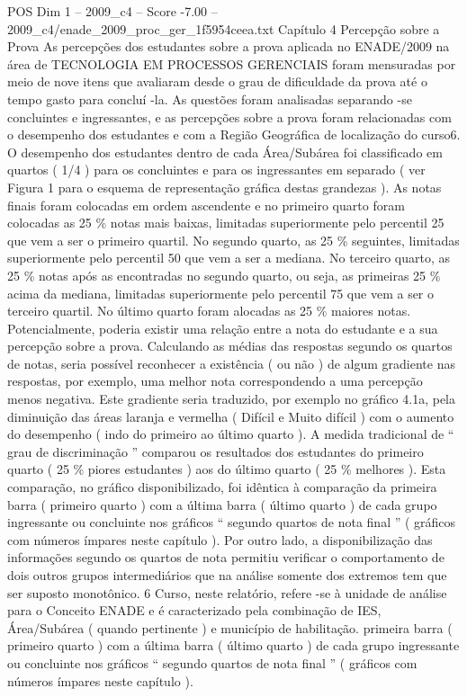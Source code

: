 \begin{textsample}{POS Dim 1 – 2009\_c4 – Score -7.00 – 2009\_c4/enade\_2009\_proc\_ger\_1f5954ceea.txt}  \label{ex:f1_pos_416}
Capítulo 4 Percepção sobre a Prova As percepções dos estudantes sobre a prova aplicada no ENADE/2009 na área de TECNOLOGIA EM PROCESSOS GERENCIAIS foram mensuradas por meio de nove itens que avaliaram desde o grau de dificuldade da prova até o tempo gasto para concluí -la.
As questões foram analisadas separando -se concluintes e ingressantes, e as percepções sobre a prova foram relacionadas com o desempenho dos estudantes e com a Região Geográfica de localização do curso6.
O desempenho dos estudantes dentro de cada Área/Subárea foi classificado em quartos ( 1/4 ) para os concluintes e para os ingressantes em separado ( ver Figura 1 para o esquema de representação gráfica destas grandezas ).
As notas finais foram colocadas em ordem ascendente e no primeiro quarto foram colocadas as 25 \% notas mais baixas, limitadas superiormente pelo percentil 25 que vem a ser o primeiro quartil.
No segundo quarto, as 25 \% seguintes, limitadas superiormente pelo percentil 50 que vem a ser a mediana.
No terceiro quarto, as 25 \% notas após as encontradas no segundo quarto, ou seja, as primeiras 25 \% acima da mediana, limitadas superiormente pelo percentil 75 que vem a ser o terceiro quartil.
No último quarto foram alocadas as 25 \% maiores notas.
Potencialmente, poderia existir uma relação entre a nota do estudante e a sua percepção sobre a prova.
Calculando as médias das respostas segundo os quartos de notas, seria possível reconhecer a existência ( ou não ) de algum gradiente nas respostas, por exemplo, uma melhor nota correspondendo a uma percepção menos negativa.
Este gradiente seria traduzido, por exemplo no gráfico 4.1a, pela diminuição das áreas laranja e vermelha ( Difícil e Muito difícil ) com o aumento do desempenho ( indo do primeiro ao último quarto ).
A medida tradicional de “ grau de discriminação ” comparou os resultados dos estudantes do primeiro quarto ( 25 \% piores estudantes ) aos do último quarto ( 25 \% melhores ).
Esta comparação, no gráfico disponibilizado, foi idêntica à comparação da primeira barra ( primeiro quarto ) com a última barra ( último quarto ) de cada grupo ingressante ou concluinte nos gráficos “ segundo quartos de nota final ” ( gráficos com números ímpares neste capítulo ).
Por outro lado, a disponibilização das informações segundo os quartos de nota permitiu verificar o comportamento de dois outros grupos intermediários que na análise somente dos extremos tem que ser suposto monotônico. 6 Curso, neste relatório, refere -se à unidade de análise para o Conceito ENADE e é caracterizado pela combinação de IES, Área/Subárea ( quando pertinente ) e município de habilitação. primeira barra ( primeiro quarto ) com a última barra ( último quarto ) de cada grupo ingressante ou concluinte nos gráficos “ segundo quartos de nota final ” ( gráficos com números ímpares neste capítulo ).

\end{textsample}
